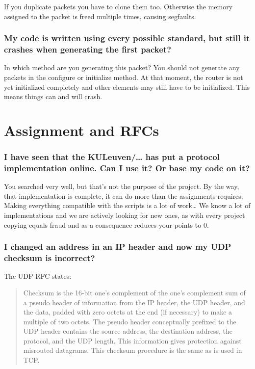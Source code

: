 \documentclass[a4paper]{article}
\begin{document}
If you duplicate packets you have to clone them too. Otherwise the
memory assigned to the packet is freed multiple times, causing
segfaults.

\subsubsection*{My code is written using every possible standard, but still it crashes
when generating the first packet?}

In which method are you generating this packet? You should not generate
any packets in the configure or initialize method. At that moment, the
router is not yet initialized completely and other elements may still
have to be initialized. This means things can and will crash.

\section{Assignment and RFCs}

\subsubsection*{I have seen that the KULeuven/\ldots{} has put a protocol implementation
online. Can I use it? Or base my code on it?}

You searched very well, but that's not the purpose of the project. By
the way, that implementation is complete, it can do more than the
assignments requires. Making everything compatible with the scripts is a
lot of work\ldots{} We know a lot of implementations and we are actively
looking for new ones, as with every project copying equals fraud and as
a consequence reduces your points to 0.

\subsubsection*{I changed an address in an IP header and now my UDP checksum is
incorrect?}

The UDP RFC states:

\begin{quote}
Checksum is the 16-bit one's complement of the one's complement sum of a
pseudo header of information from the IP header, the UDP header, and the
data, padded with zero octets at the end (if necessary) to make a
multiple of two octets. The pseudo header conceptually prefixed to the
UDP header contains the source address, the destination address, the
protocol, and the UDP length. This information gives protection against
misrouted datagrams. This checksum procedure is the same as is used in
TCP.
\end{quote}
\end{document}
